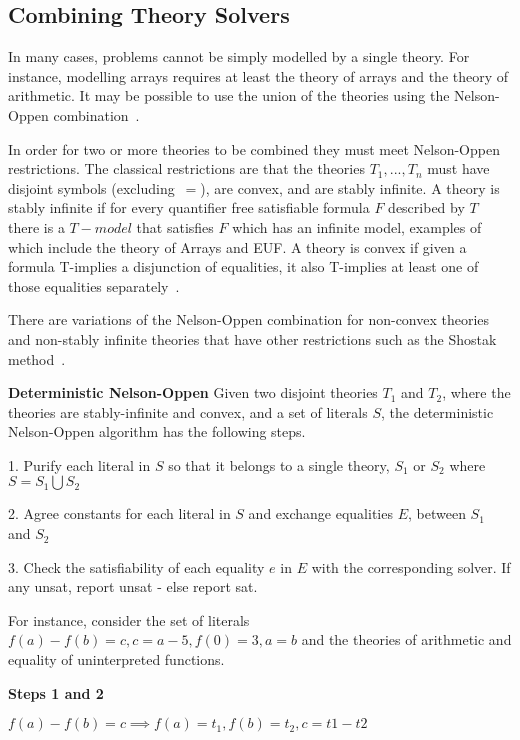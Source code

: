 \documentclass[]{final_report}
\begin{document}
\subsection{Combining Theory Solvers}
In many cases, problems cannot be simply modelled by a single theory. For instance, modelling arrays requires at least the theory of arrays and the theory of arithmetic. It may be possible to use the union of the theories using the Nelson-Oppen combination~\cite{smtdpplt}. 

In order for two or more theories to be combined they must meet Nelson-Oppen restrictions. The classical restrictions are that the theories $T_1, ..., T_n$ must have disjoint symbols (excluding~$=$), are convex, and are stably infinite. A theory is stably infinite if for every quantifier free satisfiable formula $F$ described by $T$ there is a $T-model$ that satisfies $F$ which has an infinite model, examples of which include the theory of Arrays and EUF. A theory is convex if given a formula T-implies a disjunction of equalities, it also T-implies at least one of those equalities separately~\cite{Torlak}.

There are variations of the Nelson-Oppen combination for non-convex theories and non-stably infinite theories that have other restrictions such as the Shostak method~\cite{manna2003combining}.

\textbf{Deterministic Nelson-Oppen}
Given two disjoint theories $T_1$ and $T_2$, where the theories are stably-infinite and convex, and a set of literals $S$, the deterministic Nelson-Oppen algorithm has the following steps.

1. Purify each literal in $S$ so that it belongs to a single theory, $S_1$ or $S_2$ where $S = S_1 \bigcup S_2$

2. Agree constants for each literal in $S$ and exchange equalities $E$, between $S_1$ and $S_2$

3. Check the satisfiability of each equality $e$ in $E$ with the corresponding solver. If any unsat, report unsat - else report sat.

For instance, consider the set of literals $f(a) - f(b) = c, c = a -5, f(0) = 3, a = b$ and the theories of arithmetic and equality of uninterpreted functions.

\textbf{Steps 1 and 2}

$f(a) - f(b) = c \implies f(a) = t_1, f(b) = t_2, c = t1 - t2$
\end{document}
